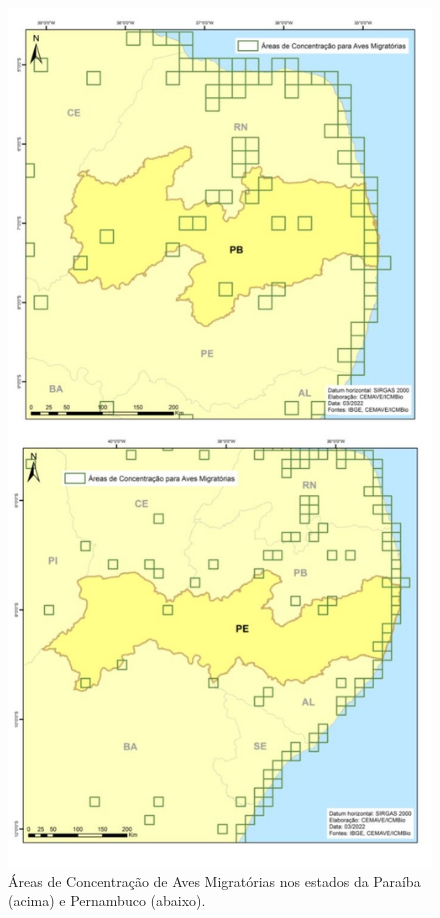 \documentclass[
  oneside]{scrbook}
\begin{document}
\begin{figure}[H]

{\centering \includegraphics[width=0.7\linewidth]{imagens/cap07/Fig_13_PB_PE} 

}

\caption{Áreas de Concentração de Aves Migratórias nos estados da Paraíba (acima) e Pernambuco (abaixo).}\label{fig:33}
\end{figure}
\end{document}
